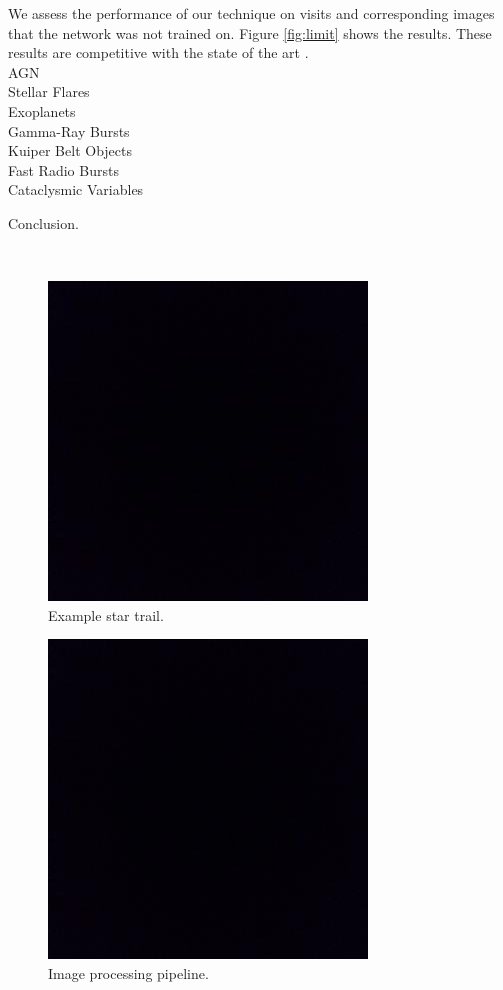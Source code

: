 \documentclass[12pt, letterpaper]{article}
\begin{document}
We assess the performance of our technique on visits and corresponding images that the network was not trained on. Figure \ref{fig:limit} shows the results. These results are competitive with the state of the art \citep{2016SPIE.9908E..0YD}. 
\\

{\color{green}
\noindent AGN\\
Stellar Flares\\
Exoplanets\\
Gamma-Ray Bursts\\
Kuiper Belt Objects\\
Fast Radio Bursts\\
Cataclysmic Variables\\
}

Conclusion.

\
\begin{figure}[htb]
\center
\includegraphics{bbox.jpeg}
\caption{Example star trail.}
\label{fig:trail}
\end{figure}

\begin{figure}[htb]
\center
\includegraphics{bbox.jpeg}
\caption{Image processing pipeline.}
\label{fig:pipeline}
\end{figure}
\end{document}

